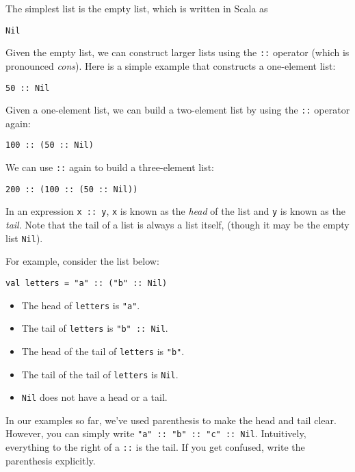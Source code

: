 \documentclass[9pt]{extbook}
\begin{document}
The simplest list is the empty list, which is written in Scala as
%
\begin{lstlisting}
Nil
\end{lstlisting}
%
Given the empty list, we can construct larger lists using the \lstinline|::|
operator (which is pronounced \emph{cons}). Here is a simple example that
constructs a one-element list:
%
\begin{lstlisting}
50 :: Nil
\end{lstlisting}
Given a one-element list, we can build a two-element list by using the
\lstinline|::| operator again:
%
\begin{lstlisting}
100 :: (50 :: Nil)
\end{lstlisting}
%
We can use \lstinline|::| again to build a three-element list:
%
\begin{lstlisting}
200 :: (100 :: (50 :: Nil))
\end{lstlisting}
%
In an expression \lstinline|x :: y|,
\lstinline|x| is known as the \emph{head} of the list and \lstinline|y| is
known as the \emph{tail}. Note that the tail of a list is always a list itself,
(though it may be the empty list \lstinline|Nil|).

For example, consider the list below:
\begin{lstlisting}
val letters = "a" :: ("b" :: Nil)
\end{lstlisting}
%
\begin{itemize}

  \item The head of \lstinline|letters| is \lstinline|"a"|.

  \item The tail of \lstinline|letters| is \lstinline|"b" :: Nil|.

  \item The head of the tail of \lstinline|letters| is \lstinline|"b"|.

  \item The tail of the tail of \lstinline|letters| is \lstinline|Nil|.

  \item \lstinline|Nil| does not have a head or a tail.

\end{itemize}

In our examples so far, we've used parenthesis to make the head and tail clear.
However, you can simply write \lstinline|"a" :: "b" :: "c" :: Nil|. Intuitively,
everything to the right of a \lstinline|::| is the tail. If you get confused, write the parenthesis explicitly.
\end{document}
